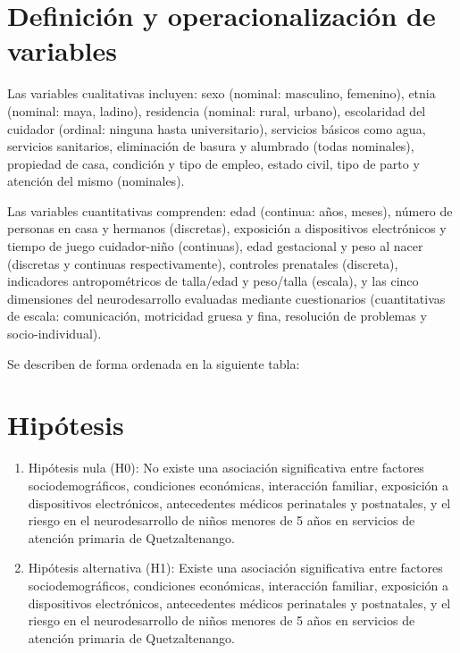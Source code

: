 \documentclass[11pt,letterpaper]{report}
\begin{document}
\section{Definición y operacionalización de variables}
Las variables cualitativas incluyen: sexo (nominal: masculino, femenino), etnia
(nominal: maya, ladino), residencia (nominal: rural, urbano), escolaridad del
cuidador (ordinal: ninguna hasta universitario), servicios básicos como agua,
servicios sanitarios, eliminación de basura y alumbrado (todas nominales),
propiedad de casa, condición y tipo de empleo, estado civil, tipo de parto y
atención del mismo (nominales).

Las variables cuantitativas comprenden: edad (continua: años, meses), número de
personas en casa y hermanos (discretas), exposición a dispositivos electrónicos
y tiempo de juego cuidador-niño (continuas), edad gestacional y peso al nacer
(discretas y continuas respectivamente), controles prenatales (discreta),
indicadores antropométricos de talla/edad y peso/talla (escala), y las cinco
dimensiones del neurodesarrollo evaluadas mediante cuestionarios (cuantitativas
de escala: comunicación, motricidad gruesa y fina, resolución de problemas y
socio-individual).

Se describen de forma ordenada en la siguiente tabla:



\section{Hipótesis}
	\begin{enumerate}
		\item Hipótesis nula (H0): No existe una asociación significativa entre
		factores sociodemográficos, condiciones económicas, interacción
		familiar, exposición a dispositivos electrónicos, antecedentes médicos
		perinatales y postnatales, y el riesgo en el neurodesarrollo de niños
		menores de 5 años en servicios de atención primaria de Quetzaltenango.
		\item Hipótesis alternativa (H1): Existe una asociación significativa
		entre factores sociodemográficos, condiciones económicas, interacción
		familiar, exposición a dispositivos electrónicos, antecedentes médicos
		perinatales y postnatales, y el riesgo en el neurodesarrollo de niños
		menores de 5 años en servicios de atención primaria de Quetzaltenango.
	\end{enumerate}
\end{document}
